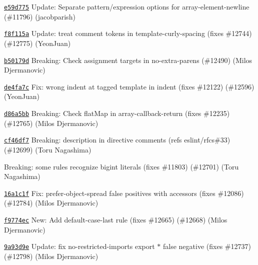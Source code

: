 \begin{DoxyItemize}
\item \href{https://github.com/eslint/eslint/commit/e59d77536bd8db57e8a75cd5245f6f320aa699f8}{\texttt{ {\ttfamily e59d775}}} Update\+: Separate pattern/expression options for array-\/element-\/newline (\#11796) (jacobparish)
\item \href{https://github.com/eslint/eslint/commit/f8f115af6e10539e6cad485588187cb11917f8c9}{\texttt{ {\ttfamily f8f115a}}} Update\+: treat comment tokens in template-\/curly-\/spacing (fixes \#12744) (\#12775) (Yeon\+Juan)
\item \href{https://github.com/eslint/eslint/commit/b50179def3fedbd95fdeab25e32c2511867eb760}{\texttt{ {\ttfamily b50179d}}} Breaking\+: Check assignment targets in no-\/extra-\/parens (\#12490) (Milos Djermanovic)
\item \href{https://github.com/eslint/eslint/commit/de4fa7c65c7befefa64d1605550267071ee56a5d}{\texttt{ {\ttfamily de4fa7c}}} Fix\+: wrong indent at tagged template in indent (fixes \#12122) (\#12596) (Yeon\+Juan)
\item \href{https://github.com/eslint/eslint/commit/d86a5bbb1987d858d4963f647b0af5c1fd924b4f}{\texttt{ {\ttfamily d86a5bb}}} Breaking\+: Check flat\+Map in array-\/callback-\/return (fixes \#12235) (\#12765) (Milos Djermanovic)
\item \href{https://github.com/eslint/eslint/commit/cf46df70158a4ed4c09d5c9d655c07dc6df3ff5e}{\texttt{ {\ttfamily cf46df7}}} Breaking\+: description in directive comments (refs eslint/rfcs\#33) (\#12699) (Toru Nagashima)
\item \href{https://github.com/eslint/eslint/commit/7350589a5bdfc9d75d1ff19364f476eec44c3911}{\texttt{ {}}} Breaking\+: some rules recognize bigint literals (fixes \#11803) (\#12701) (Toru Nagashima)
\item \href{https://github.com/eslint/eslint/commit/16a1c1f79bc0a4cc1c3a87e98d220041de88bb93}{\texttt{ {\ttfamily 16a1c1f}}} Fix\+: prefer-\/object-\/spread false positives with accessors (fixes \#12086) (\#12784) (Milos Djermanovic)
\item \href{https://github.com/eslint/eslint/commit/f9774ec11b0ebe63fb16a97b97890efb84699548}{\texttt{ {\ttfamily f9774ec}}} New\+: Add default-\/case-\/last rule (fixes \#12665) (\#12668) (Milos Djermanovic)
\item \href{https://github.com/eslint/eslint/commit/9a93d9ef389c49a133c4df4f9843927f5f806423}{\texttt{ {\ttfamily 9a93d9e}}} Update\+: fix no-\/restricted-\/imports export \texorpdfstring{$\ast$}{*} false negative (fixes \#12737) (\#12798) (Milos Djermanovic)

\end{DoxyItemize}
